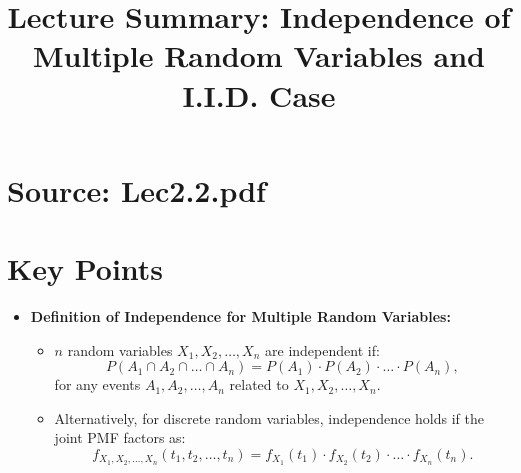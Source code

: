 \documentclass{article}
\title{Lecture Summary: Independence of Multiple Random Variables and I.I.D. Case}
\author{}
\date{}
\begin{document}
\maketitle

\section*{Source: Lec2.2.pdf}

\section*{Key Points}

\begin{itemize}
  \item \textbf{Definition of Independence for Multiple Random Variables:}
    \begin{itemize}
      \item $n$ random variables $X_1, X_2, \dots, X_n$ are independent if:
        \[
          P(A_1 \cap A_2 \cap \dots \cap A_n) = P(A_1) \cdot P(A_2) \cdot \dots \cdot P(A_n),
        \]
        for any events $A_1, A_2, \dots, A_n$ related to $X_1, X_2, \dots, X_n$.
      \item Alternatively, for discrete random variables, independence holds if the joint PMF factors as:
        \[
          f_{X_1, X_2, \dots, X_n}(t_1, t_2, \dots, t_n) = f_{X_1}(t_1) \cdot f_{X_2}(t_2) \cdot \dots \cdot f_{X_n}(t_n).
        \]
    \end{itemize}


\end{itemize}
\end{document}

